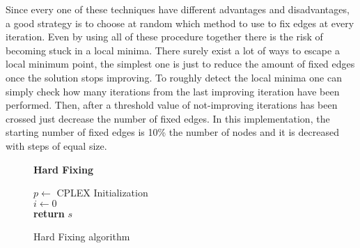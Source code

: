 Since every one of these techniques have different advantages and disadvantages, a good strategy is to choose at random which method to use to fix edges at every iteration.
Even by using all of these procedure together there is the risk of becoming stuck in a local minima.
There surely exist a lot of ways to escape a local minimum point, the simplest one is just to reduce the amount of fixed edges once the solution stops improving.
To roughly detect the local minima one can simply check how many iterations from the last improving iteration have been performed.
Then, after a threshold value of not-improving iterations has been crossed just decrease the number of fixed edges.
In this implementation, the starting number of fixed edges is 10\% the number of nodes and it is decreased with steps of equal size.
\begin{figure}[htbp]
	\textbf{Hard Fixing} \\
	\begin{algorithm}[H]
		\vspace{2mm}
        $p \gets$ CPLEX Initialization \\
        $i \gets 0$ \\ 
        \textbf{return} $s$
	\end{algorithm}
	\caption{Hard Fixing algorithm} \label{fig:hardfix}
\end{figure}

